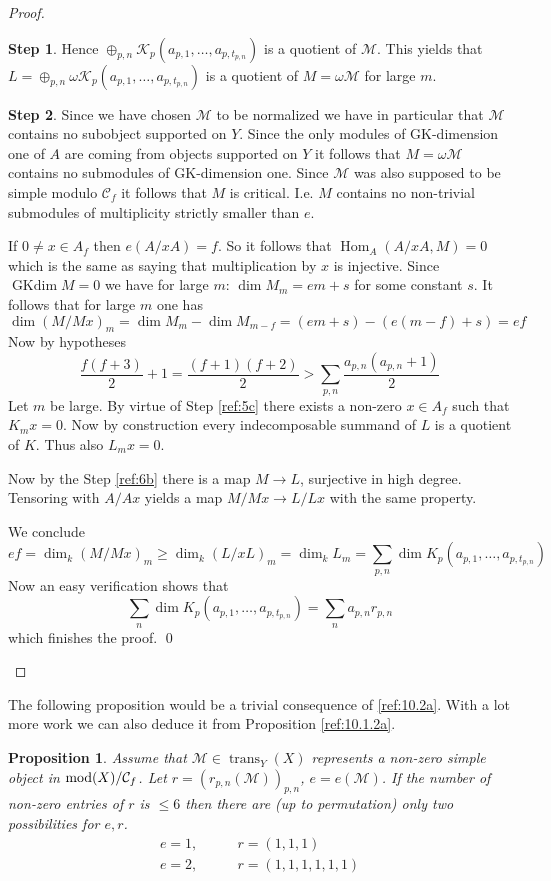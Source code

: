 \documentclass{amsproc}
\def\Cscr{{\mathcal C}}
\def\Kscr{{\mathcal K}}
\def\Mscr{{\mathcal M}}
\def\mod{\mathop{\text{mod}}}
\def\trans{\operatorname{trans}}
\def\Hom{\operatorname {Hom}}
\def\r{\rightarrow}
\let\oldtext\text
\def\text#1{\oldtext{\upshape #1}}
\DeclareMathOperator{\GKdim}{GKdim}
\newtheorem{propositions}[lemmas]{Proposition}
\theoremstyle{definition}
\newtheorem{step}{Step}
\theoremstyle{remark}
\numberwithin{equation}{section}
\numberwithin{table}{section}
\numberwithin{figure}{section}
\begin{document}
\begin{proof}
\begin{step}
Hence $\oplus_{p,n} \Kscr_p(a_{p,1},\ldots,a_{p,t_{p,n}})$ is a quotient
of $\Mscr$. This yields that $L=\oplus_{p,n}
\omega \Kscr_p(a_{p,1},\ldots,a_{p,t_{p,n}})$ is a quotient of
$M=\omega\Mscr$ for large $m$.
\end{step}
\begin{step}
\label{ref:7b}
Since we have chosen $\Mscr$ to be normalized we have in particular
that $\Mscr$ contains no subobject supported on $Y$. Since the only
modules of GK-dimension one of $A$ are coming from objects supported on
$Y$ \cite{ATV2} it follows that $M=\omega \Mscr$ contains no
submodules of GK-dimension one. Since $\Mscr$ was also supposed to be
simple modulo $\Cscr_f$ it follows that $M$ is critical. I.e. $M$
contains no non-trivial submodules of multiplicity strictly smaller
than $e$.

If $0\neq x\in A_f$ then $e(A/xA)=f$. So it follows that
$\Hom_A(A/xA,M)=0$ which is the same as saying that multiplication by
$x$ is injective. Since $\GKdim M=0$ we have for large $m$: $\dim
M_m=em+s$ for some constant $s$.
It follows that  for large $m$ one has
\begin{equation}
\label{ref:10.6a}
\dim (M/Mx)_m=\dim M_m-\dim M_{m-f}=(em+s)-(e(m-f)+s)=ef
\end{equation}
Now by hypotheses
\[
\frac{f(f+3)}{2}+1=\frac{(f+1)(f+2)}{2}> 
\sum_{p,n} \frac{a_{p,n}(a_{p,n}+1)}{2} 
\]
Let $m$ be large. By virtue of Step \ref{ref:5c} there exists a
non-zero $x\in A_f$ such that $K_m x=0$. Now by construction every
indecomposable summand of $L$ 
 is  a quotient of $K$. Thus also $L_mx=0$.

Now by the Step \ref{ref:6b} there is a map $M\r L$, surjective in
high degree. Tensoring with $A/Ax$ yields a map $M/Mx\r L/Lx$ with the
same property.

We conclude
\[
ef=\dim_k(M/Mx)_m\ge \dim_k (L/xL)_m=\dim_k L_m=\sum_{p,n} 
\dim K_p(a_{p,1},\ldots, a_{p,t_{p,n}})
\]
Now an easy verification shows that 
\[
\sum_{n} 
\dim K_p(a_{p,1},\ldots, a_{p,t_{p,n}})=\sum_n a_{p,n} r_{p,n}
\]
which finishes the proof.
\qed\end{step}
\def\qed{}\end{proof}
The following proposition would be a trivial consequence of
\eqref{ref:10.2a}. With a lot more work we can also deduce it from 
Proposition \ref{ref:10.1.2a}.
\begin{propositions}
Assume that $\Mscr\in \trans_Y(X)$ represents a non-zero simple object
in $\mod(X)/\Cscr_f$. Let $r=(r_{p,n}(\Mscr))_{p,n}$, $e=e(\Mscr)$. If the number
of non-zero entries of $r$ is $\le 6$ then there are (up to
permutation) only two possibilities for $e,r$.
\begin{align*}
e=1,\qquad &r=(1,1,1)\\
e=2,\qquad &r=(1,1,1,1,1,1)
\end{align*}
\end{propositions}
\end{document}
